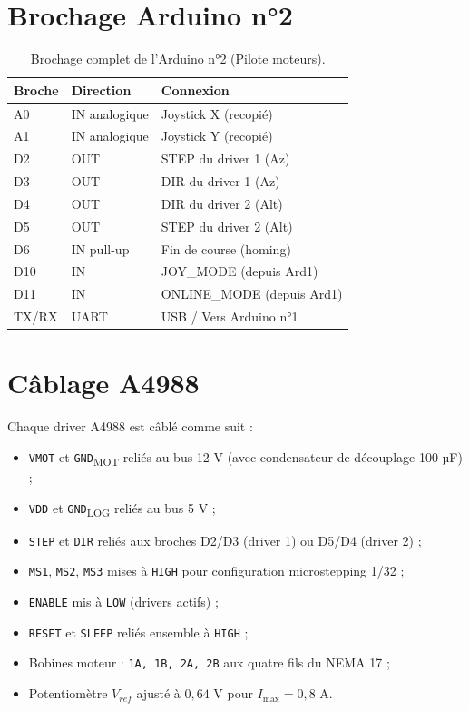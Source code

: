 \documentclass[12pt,a4paper]{report}
\begin{document}
\begin{enumerate}
\begin{enumerate}
\section{Brochage Arduino n°2}
\begin{table}[H]
    \centering
    \caption{Brochage complet de l'Arduino n°2 (Pilote moteurs).}
    \begin{tabular}{|l|l|l|}
        \hline
        \textbf{Broche} & \textbf{Direction} & \textbf{Connexion} \\
        \hline
        A0 & IN analogique & Joystick X (recopié) \\
        A1 & IN analogique & Joystick Y (recopié) \\
        D2 & OUT & STEP du driver 1 (Az) \\
        D3 & OUT & DIR du driver 1 (Az) \\
        D4 & OUT & DIR du driver 2 (Alt) \\
        D5 & OUT & STEP du driver 2 (Alt) \\
        D6 & IN pull-up & Fin de course (homing) \\
        D10 & IN & JOY\_MODE (depuis Ard1) \\
        D11 & IN & ONLINE\_MODE (depuis Ard1) \\
        TX/RX & UART & USB / Vers Arduino n°1 \\
        \hline
    \end{tabular}
\end{table}

\section{Câblage A4988}
Chaque driver A4988 est câblé comme suit :
\begin{itemize}
    \item \texttt{VMOT} et \texttt{GND}\textsubscript{MOT} reliés au bus 12 V (avec condensateur de découplage 100 µF) ;
    \item \texttt{VDD} et \texttt{GND}\textsubscript{LOG} reliés au bus 5 V ;
    \item \texttt{STEP} et \texttt{DIR} reliés aux broches D2/D3 (driver 1) ou D5/D4 (driver 2) ;
    \item \texttt{MS1}, \texttt{MS2}, \texttt{MS3} mises à \texttt{HIGH} pour configuration microstepping 1/32 ;
    \item \texttt{ENABLE} mis à \texttt{LOW} (drivers actifs) ;
    \item \texttt{RESET} et \texttt{SLEEP} reliés ensemble à \texttt{HIGH} ;
    \item Bobines moteur : \texttt{1A, 1B, 2A, 2B} aux quatre fils du NEMA 17 ;
    \item Potentiomètre $V_{ref}$ ajusté à $0{,}64$ V pour $I_{\max} = 0{,}8$ A.
\end{itemize}


\end{enumerate}
\end{enumerate}
\end{document}
